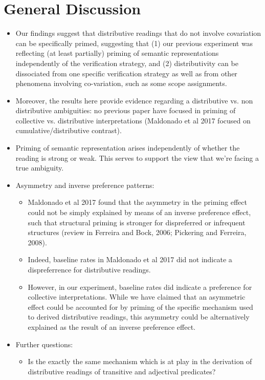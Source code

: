 \documentclass[a4paper, 11pt]{article}
\begin{document}
\section{General Discussion}

\begin{itemize}

\item Our findings suggest that distributive readings that do not involve covariation can be specifically primed, suggesting that (1) our previous experiment was reflecting (at least partially) priming of semantic representations independently of the verification strategy, and (2) distributivity can be dissociated from one specific verification strategy as well as from other phenomena involving co-variation, such as some scope assignments.  

\item Moreover, the results here provide evidence regarding a distributive vs. non distributive ambiguities: no previous paper have focused in priming of collective vs. distributive interpretations (Maldonado et al 2017 focused on cumulative/distributive contrast).

\item Priming of semantic representation arises independently of whether the reading is strong or weak. This serves to support the view that we’re facing a true ambiguity.  

\item Asymmetry and inverse preference patterns: 

\begin{itemize}
\item Maldonado et al 2017 found that the asymmetry in the priming effect could not be simply explained by means of an inverse preference effect, such that structural priming is stronger for dispreferred or infrequent structures (review in Ferreira and Bock, 2006; Pickering and Ferreira, 2008). 
\item Indeed, baseline rates in Maldonado et al 2017 did not indicate a dispreferrence for distributive readings. 

\item However, in our experiment, baseline rates did indicate a preference for collective interpretations. While we have claimed that an asymmetric effect could be accounted for by priming of the specific mechanism used to derived distributive readings, this asymmetry could be alternatively explained as the result of an inverse preference effect. 

\end{itemize}



\item Further questions:
\begin{itemize}
\item Is the exactly the same mechanism which is at play in the derivation of distributive readings of transitive and adjectival predicates?

\end{itemize}


\end{itemize}
\end{document}
